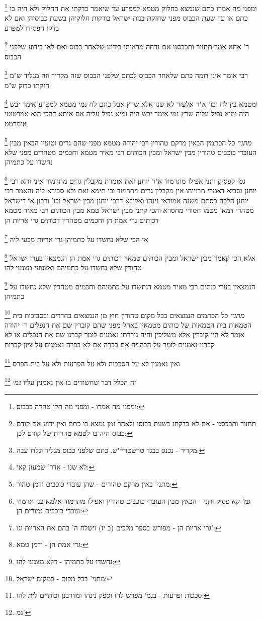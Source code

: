 \documentclass[12pt, openany]{book}
\newcommand{\footnotecomment}[1]{
	\renewcommand\thefootnote{}
	\footnote{#1}}
\newcommand{\commenta}[1]{\footnotecomment{#1}}
\begin{document}
{\commenta{ומפני מה אמרו - ומפני מה תלו טהרה בכבוס:}
ומפני מה אמרו כתם שנמצא בחלוק מטמא למפרע עד שיאמר בדקתי את החלוק ולא היה בו כתם או עד שעת הכבוס מפני שחזקת בנות ישראל בודקות חלוקיהן בשעת כבוסיהן ואם לא בדקו הפסידו למפרע 
\commenta{תחזור ותכבסנו - אם לא בדקתו בשעת כבוסו ולאחר זמן נמצא בו כתם ואין ידוע אם קודם כבוס היה בו לטמא טהרות של קודם לכן:}
ר' אחא אמר תחזור ותכבסנו אם נדחה מראיתו בידוע שלאחר כבוס ואם לאו בידוע שלפני הכבוס 
\commenta{מקדיר - נכנס בבגד טרשטריי"ש. כתם שלפני כבוס מגליד וגלדו עבה:}
רבי אומר אינו דומה כתם שלאחר הכבוס לכתם שלפני הכבוס שזה מקדיר וזה מגליד ש"מ חזקתו בדוק ש"מ
\commenta{לא שנו - אדר' שמעון קאי:}
ומטמא בין לח וכו' א"ר אלעזר לא שנו אלא שרץ אבל כתם לח נמי מטמא למפרע אימר יבש היה ומיא נפיל עליה 
שרץ נמי אימר יבש היה ומיא נפיל עליה אם איתא דהכי הוא אמרטוטי אימרטט
\commenta{מתני' באין מרקם טהורים - שהן עובדי כוכבים ודמן טהור:}
{\large\emph{מתני׳}} כל הכתמין הבאין מרקם טהורין רבי יהודה מטמא מפני שהם גרים וטועין הבאין מבין העובדי כוכבים טהורין מבין ישראל ומבין הכותים רבי מאיר מטמא וחכמים מטהרים מפני שלא נחשדו על כתמיהן
\commenta{גמ' קא פסיק ותני - הבאין מבין העובדי כוכבים טהורין ואפילו מתרמוד אלמא בני תרמוד עובדי כוכבים גמורים הן:}
{\large\emph{גמ׳}} קפסיק ותני אפילו מתרמוד א"ר יוחנן זאת אומרת מקבלין גרים מתרמוד 
איני והא רבי יוחנן וסביא דאמרי תרוייהו אין מקבלין גרים מתרמוד 
וכי תימא זאת ולא סבירא ליה והאמר רבי יוחנן הלכה כסתם משנה 
אמוראי נינהו ואליבא דרבי יוחנן
מבין ישראל וכו' ורבנן אי דישראל מטהרי דמאן מטמו 
חסורי מחסרא והכי קתני מבין ישראל טמא מבין הכותים רבי מאיר מטמא דכותים גרי אמת הן וחכמים מטהרין דכותים גרי אריות הן 
\commenta{גרי אריות הן - מפורש בספר מלכים (ב יז) וישלח ה' בהם את האריות וגו':
}
אי הכי שלא נחשדו על כתמיהן גרי אריות מבעי ליה 
\commenta{גרי אמת הן - ודמן טמא:}
אלא הכי קאמר מבין ישראל ומבין הכותים טמאין דכותים גרי אמת הן הנמצאין בערי ישראל טהורין שלא נחשדו על כתמיהם ואצנועי מצנעי להו 
\commenta{נחשדו על כתמיהן - דלא מצנעי להו:
}
הנמצאין בערי כותים רבי מאיר מטמא דנחשדו על כתמיהם וחכמים מטהרין שלא נחשדו על כתמיהן 
\commenta{מתני' בכל מקום - במקום ישראל:}
{\large\emph{מתני׳}} כל הכתמים הנמצאים בכל מקום טהורין חוץ מן הנמצאים בחדרים ובסביבות בית הטמאות
בית הטמאות של כותים מטמאין באהל מפני שהם קוברין שם את הנפלים ר' יהודה אומר לא היו קוברין אלא משליכין וחיה גוררתו 
נאמנים לומר קברנו שם את הנפלים או לא קברנו נאמנים לומר על הבהמה אם בכרה אם לא בכרה נאמנים על ציון קברות
\commenta{סככות ופרעות - בגמ' מפרש להו וספק נינהו ומדרבנן וכותיים לית להו:}
ואין נאמנין לא על הסככות ולא על הפרעות ולא על בית הפרס 
\commenta{ גמ'}
זה הכלל דבר שחשודים בו אין נאמנין עליו {\large\emph{גמ׳}} 
\clearpage}
\end{document}
